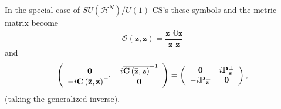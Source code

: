 \documentclass[aps,preprint]{revtex4}%
\begin{document}
In the special case of $SU\left(  \mathcal{H}^{N}\right)  /U\left(  1\right)
$-CS's these symbols and the metric matrix become%
\begin{equation}
\mathcal{O}\left(  \mathbf{\bar{z},z}\right)  =\frac{\mathbf{z}^{\dagger
}\mathbb{O}\mathbf{z}}{\mathbf{z}^{\dagger}\mathbf{z}}%
\end{equation}
and
\begin{equation}
\left(
\begin{array}
[c]{cc}%
\mathbf{0} & i\overline{\mathbf{C}\left(  \mathbf{\bar{z},z}\right)  }^{-1}\\
-i\mathbf{C}\left(  \mathbf{\bar{z},z}\right)  ^{-1} & \mathbf{0}%
\end{array}
\right)  =\left(
\begin{array}
[c]{cc}%
\mathbf{0} & i\mathbf{P}_{\mathbf{\bar{z}}}^{\bot}\\
-i\mathbf{P}_{\mathbf{z}}^{\bot} & \mathbf{0}%
\end{array}
\right)  ,
\end{equation}
(taking the generalized inverse).
\end{document}
